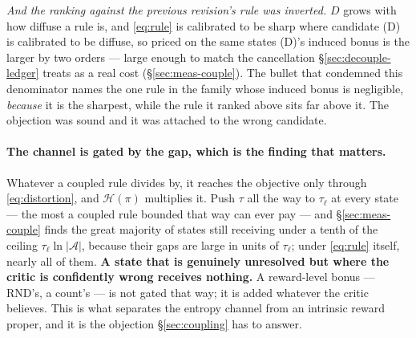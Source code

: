 \documentclass{article}
\newcommand{\actions}{\mathcal{A}}
\newcommand{\h}{\mathcal{H}}
\begin{document}
\emph{And the ranking against the previous revision's rule was inverted.} $D$ grows with how
diffuse a rule is, and \eqref{eq:rule} is calibrated to be sharp where candidate (D) is
calibrated to be diffuse, so priced on the same states (D)'s induced bonus is the larger by two
orders --- large enough to match the cancellation \S\ref{sec:decouple-ledger} treats as a real
cost (\S\ref{sec:meas-couple}). The bullet that condemned this denominator names the one rule in
the family whose induced bonus is negligible, \emph{because} it is the sharpest, while the rule
it ranked above sits far above it. The objection was sound and it was attached to the wrong
candidate.

\paragraph{The channel is gated by the gap, which is the finding that matters.} Whatever a
coupled rule divides by, it reaches the objective only through \eqref{eq:distortion}, and
$\h(\pi)$ multiplies it. Push $\tau$ all the way to $\tau_\ell$ at every state --- the most a
coupled rule bounded that way can ever pay --- and \S\ref{sec:meas-couple} finds the great
majority of states still receiving under a tenth of the ceiling $\tau_\ell\ln|\actions|$, because
their gaps are large in units of $\tau_\ell$; under \eqref{eq:rule} itself, nearly all of them.
\textbf{A state that is genuinely unresolved but
where the critic is confidently wrong receives nothing.} A reward-level bonus --- RND's, a
count's --- is not gated that way; it is added whatever the critic believes. This is what
separates the entropy channel from an intrinsic reward proper, and it is the objection
\S\ref{sec:coupling} has to answer.
\end{document}
